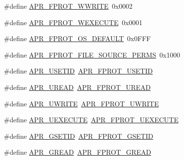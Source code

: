 \begin{DoxyCompactItemize}
\#define \mbox{\hyperlink{group__apr__file__permissions_ga51692a9828f5b6288d89495378944260}{A\+P\+R\+\_\+\+F\+P\+R\+O\+T\+\_\+\+W\+W\+R\+I\+TE}}~0x0002
\item 
\#define \mbox{\hyperlink{group__apr__file__permissions_ga760d69c09b38ddf1e0aff09362d8ce11}{A\+P\+R\+\_\+\+F\+P\+R\+O\+T\+\_\+\+W\+E\+X\+E\+C\+U\+TE}}~0x0001
\item 
\#define \mbox{\hyperlink{group__apr__file__permissions_gad3c65a67ee6eb12ecc6a33857397900b}{A\+P\+R\+\_\+\+F\+P\+R\+O\+T\+\_\+\+O\+S\+\_\+\+D\+E\+F\+A\+U\+LT}}~0x0\+F\+FF
\item 
\#define \mbox{\hyperlink{group__apr__file__permissions_gac08d4e868c7c9532f7c97c70556663dc}{A\+P\+R\+\_\+\+F\+P\+R\+O\+T\+\_\+\+F\+I\+L\+E\+\_\+\+S\+O\+U\+R\+C\+E\+\_\+\+P\+E\+R\+MS}}~0x1000
\item 
\#define \mbox{\hyperlink{group__apr__file__permissions_gafae6b531c08999345536cae5654d0d03}{A\+P\+R\+\_\+\+U\+S\+E\+T\+ID}}~\mbox{\hyperlink{group__apr__file__permissions_ga67caebf5bbe4f3f4b6252a75e5ce066f}{A\+P\+R\+\_\+\+F\+P\+R\+O\+T\+\_\+\+U\+S\+E\+T\+ID}}
\item 
\#define \mbox{\hyperlink{group__apr__file__permissions_ga51dc87ecd94c98e97694e68d5d9620a0}{A\+P\+R\+\_\+\+U\+R\+E\+AD}}~\mbox{\hyperlink{group__apr__file__permissions_gaab6c4c2e7b95f4345c248c27b3f1a655}{A\+P\+R\+\_\+\+F\+P\+R\+O\+T\+\_\+\+U\+R\+E\+AD}}
\item 
\#define \mbox{\hyperlink{group__apr__file__permissions_ga4faa7fdfa3bcda569dd1e23ae002c5e5}{A\+P\+R\+\_\+\+U\+W\+R\+I\+TE}}~\mbox{\hyperlink{group__apr__file__permissions_ga50b985779b15fbfdae0758e98ffb92af}{A\+P\+R\+\_\+\+F\+P\+R\+O\+T\+\_\+\+U\+W\+R\+I\+TE}}
\item 
\#define \mbox{\hyperlink{group__apr__file__permissions_ga4c08d7e798ab4022e31ed70f06f202b5}{A\+P\+R\+\_\+\+U\+E\+X\+E\+C\+U\+TE}}~\mbox{\hyperlink{group__apr__file__permissions_ga156e1374a4ef30e745340d8c20b36d03}{A\+P\+R\+\_\+\+F\+P\+R\+O\+T\+\_\+\+U\+E\+X\+E\+C\+U\+TE}}
\item 
\#define \mbox{\hyperlink{group__apr__file__permissions_ga4e4e9bb05f2bb156b174461551c9c329}{A\+P\+R\+\_\+\+G\+S\+E\+T\+ID}}~\mbox{\hyperlink{group__apr__file__permissions_ga5fcf6746afdd4e9b8be6ceab6892a3f5}{A\+P\+R\+\_\+\+F\+P\+R\+O\+T\+\_\+\+G\+S\+E\+T\+ID}}
\item 
\#define \mbox{\hyperlink{group__apr__file__permissions_ga1bd0305f31cb3bb20a8f9db898b96eb1}{A\+P\+R\+\_\+\+G\+R\+E\+AD}}~\mbox{\hyperlink{group__apr__file__permissions_ga5ad9b67b8008db3ffc56c3c2a65aa192}{A\+P\+R\+\_\+\+F\+P\+R\+O\+T\+\_\+\+G\+R\+E\+AD}}

\end{DoxyCompactItemize}
